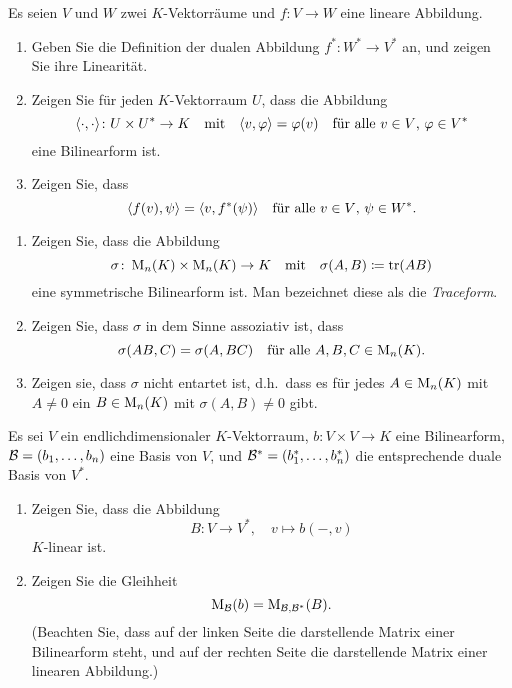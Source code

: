 \documentclass[a4paper,10pt]{scrartcl}
\begin{document}
\begin{question}
  Es seien $V$ und $W$ zwei $K$-Vektorräume und $f \colon V \to W$ eine lineare Abbildung.
  \begin{enumerate}[leftmargin=*]
    \item
      Geben Sie die Definition der dualen Abbildung $f^* \colon W^* \to V^*$ an, und zeigen Sie ihre Linearität.
    \item
      Zeigen Sie für jeden $K$-Vektorraum $U$, dass die Abbildung
      \[
        \langle \cdot, \cdot \rangle \colon U \times U^* \to K
        \quad\text{mit}\quad
        \langle v, \varphi \rangle = \varphi(v)
        \quad\text{für alle $v \in V$, $\varphi \in V^*$}
      \]
      eine Bilinearform ist.
    \item
      Zeigen Sie, dass
      \[
        \langle f(v), \psi \rangle = \langle v, f^*(\psi) \rangle
        \quad
        \text{für alle $v \in V$, $\psi \in W^*$}.
      \]
  \end{enumerate}
\end{question}


\begin{question}
  \begin{enumerate}[leftmargin=*]
    \item
      Zeigen Sie, dass die Abbildung
      \[
        \sigma \colon \operatorname{M}_n(K) \times \operatorname{M}_n(K) \to K
        \quad\text{mit}\quad
        \sigma(A, B) \coloneqq \operatorname{tr}(AB)
      \]
      eine symmetrische Bilinearform ist.
      Man bezeichnet diese als die \emph{Traceform}.
    \item
      Zeigen Sie, dass $\sigma$ in dem Sinne assoziativ ist, dass
      \[
        \sigma(AB, C) = \sigma(A, BC)
        \quad
        \text{für alle $A, B, C \in \operatorname{M}_n(K)$}.
      \]
    \item
      Zeigen sie, dass $\sigma$ nicht entartet ist, d.h.\ dass es für jedes $A \in \operatorname{M}_n(K)$ mit $A \neq 0$ ein $B \in \operatorname{M}_n(K)$ mit $\sigma(A, B) \neq 0$ gibt.
  \end{enumerate}
\end{question}


\begin{question}
  Es sei $V$ ein endlichdimensionaler $K$-Vektorraum, $b \colon V \times V \to K$ eine Bilinearform, $\mathcal{B} = (b_1, \dotsc, b_n)$ eine Basis von $V$, und $\mathcal{B}^* = (b_1^*, \dotsc, b_n^*)$ die entsprechende duale Basis von $V^*$.
  \begin{enumerate}[leftmargin=*]
    \item
      Zeigen Sie, dass die Abbildung
      \[
        B \colon V \to V^*,
        \quad
        v \mapsto b(-,v)
      \]
      $K$-linear ist.
    \item
      Zeigen Sie die Gleihheit
      \[
        \operatorname{M}_{\mathcal{B}}(b) = \operatorname{M}_{\mathcal{B}, \mathcal{B}^*}(B).
      \]
      (Beachten Sie, dass auf der linken Seite die darstellende Matrix einer Bilinearform steht, und auf der rechten Seite die darstellende Matrix einer linearen Abbildung.)
  \end{enumerate}
\end{question}
\end{document}
